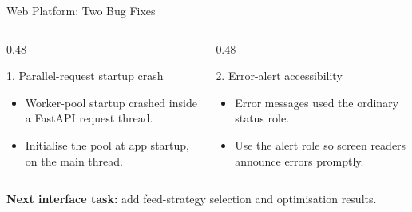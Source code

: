 \documentclass[aspectratio=169, 11pt]{beamer}
\begin{document}
\begin{frame}{Web Platform: Two Bug Fixes}
  \begin{columns}[T]
    \begin{column}{0.48\textwidth}
      \begin{block}{1. Parallel-request startup crash}
        \begin{itemize}
          \item Worker-pool startup crashed inside a FastAPI request thread.
          \item Initialise the pool at app startup, on the main thread.
        \end{itemize}
      \end{block}
    \end{column}
    \begin{column}{0.48\textwidth}
      \begin{block}{2. Error-alert accessibility}
        \begin{itemize}
          \item Error messages used the ordinary status role.
          \item Use the alert role so screen readers announce errors promptly.
        \end{itemize}
      \end{block}
    \end{column}
  \end{columns}
  \vspace{0.45cm}
  \begin{center}
  \end{center}
  \vspace{0.15cm}
  {\small \textbf{Next interface task:} add feed-strategy selection and optimisation results.}
\end{frame}
\end{document}
